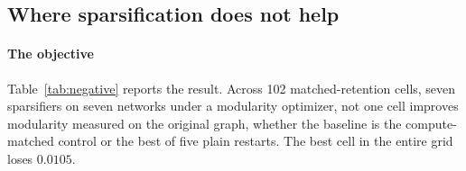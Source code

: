 %
%
%

\subsection{Where sparsification does not help}\label{sec:experiments:negative}

\paragraph{The objective}

Table~\ref{tab:negative} reports the result. Across 102 matched-retention cells,
seven sparsifiers on seven networks under a modularity optimizer, not one cell
improves modularity measured on the original graph, whether the baseline is the
compute-matched control or the best of five plain restarts. The best cell in the
entire grid loses $0.0105$.

